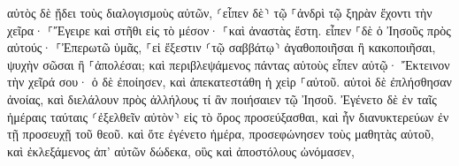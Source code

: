 \documentclass{openreader}
\begin{document}
αὐτὸς δὲ ᾔδει τοὺς διαλογισμοὺς αὐτῶν, ⸂εἶπεν δὲ⸃ τῷ ⸀ἀνδρὶ τῷ ξηρὰν ἔχοντι τὴν χεῖρα· ⸀Ἔγειρε καὶ στῆθι εἰς τὸ μέσον· ⸀καὶ ἀναστὰς ἔστη. 
εἶπεν ⸀δὲ ὁ Ἰησοῦς πρὸς αὐτούς· ⸀Ἐπερωτῶ ὑμᾶς, ⸀εἰ ἔξεστιν ⸂τῷ σαββάτῳ⸃ ἀγαθοποιῆσαι ἢ κακοποιῆσαι, ψυχὴν σῶσαι ἢ ⸀ἀπολέσαι; 
καὶ περιβλεψάμενος πάντας αὐτοὺς εἶπεν αὐτῷ· Ἔκτεινον τὴν χεῖρά σου· ὁ δὲ ἐποίησεν, καὶ ἀπεκατεστάθη ἡ χεὶρ ⸀αὐτοῦ. 
αὐτοὶ δὲ ἐπλήσθησαν ἀνοίας, καὶ διελάλουν πρὸς ἀλλήλους τί ἂν ποιήσαιεν τῷ Ἰησοῦ. 
Ἐγένετο δὲ ἐν ταῖς ἡμέραις ταύταις ⸂ἐξελθεῖν αὐτὸν⸃ εἰς τὸ ὄρος προσεύξασθαι, καὶ ἦν διανυκτερεύων ἐν τῇ προσευχῇ τοῦ θεοῦ. 
καὶ ὅτε ἐγένετο ἡμέρα, προσεφώνησεν τοὺς μαθητὰς αὐτοῦ, καὶ ἐκλεξάμενος ἀπ’ αὐτῶν δώδεκα, οὓς καὶ ἀποστόλους ὠνόμασεν, 
\end{document}
